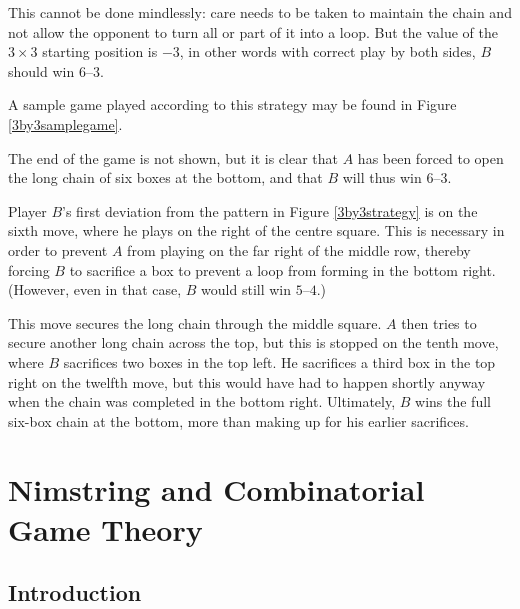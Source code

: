 \documentclass[a4paper,twocolumn]{article}
\begin{document}
\begin{figure*}
  \centering
  \def\svgscale{0.7}
  
  \caption{Player $B$'s winning strategy in $3 \times 3$ dots-and-boxes}
  \label{3by3strategy}
\end{figure*}

This cannot be done mindlessly: care needs to be taken to maintain the
chain and not allow the opponent to turn all or part of it into a
loop. But the value of the $3 \times 3$ starting position is $-3$, in
other words with correct play by both sides, $B$ should win $6$--$3$.

A sample game played according to this strategy may be found in Figure
\ref{3by3samplegame}.

\begin{figure*}
  \centering
  \def\svgscale{0.5}
  
  \caption{Sample $3 \times 3$ game played according to Berlekamp's
    strategy}
  \label{3by3samplegame}
\end{figure*}

The end of the game is not shown, but it is clear that $A$ has been
forced to open the long chain of six boxes at the bottom, and that $B$
will thus win 6--3.

Player $B$'s first deviation from the pattern in Figure
\ref{3by3strategy} is on the sixth move, where he plays on the right
of the centre square. This is necessary in order to prevent $A$ from
playing on the far right of the middle row, thereby forcing $B$ to
sacrifice a box to prevent a loop from forming in the bottom
right. (However, even in that case, $B$ would still win $5$--$4$.)

This move secures the long chain through the middle square. $A$ then
tries to secure another long chain across the top, but this is stopped
on the tenth move, where $B$ sacrifices two boxes in the top left. He
sacrifices a third box in the top right on the twelfth move, but this
would have had to happen shortly anyway when the chain was completed
in the bottom right. Ultimately, $B$ wins the full six-box chain at
the bottom, more than making up for his earlier sacrifices.

\section{Nimstring and Combinatorial Game Theory}

\subsection{Introduction}
\end{document}
